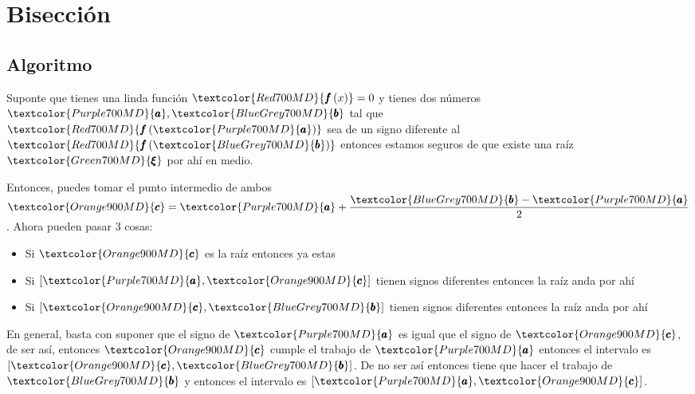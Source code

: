 \documentclass[12pt, fleqn]{report}                             %
\theoremstyle{break}                                            %
\newcommand{\Wrap}[1]           {\left( #1 \right)}             %
\newcommand{\Color}[2]{\textcolor{#1}{#2}}                      %
\newcommand \ColorFun          {Red700MD}                       %
\newcommand \ColorRoot         {Green700MD}                     %
\newcommand \ColorVarA         {Purple700MD}                    %
\newcommand \ColorVarB         {BlueGrey700MD}                  %
\newcommand \ColorVarC         {Orange900MD}                    %
\newcommand \Fun[1]      {\Color{\ColorFun}{\pmb{f}\Wrap{#1}}}          %
\newcommand \Root        {\Color{\ColorRoot}{\pmb{\xi} }}               %
\newcommand \VarA        {\Color{\ColorVarA}{\pmb{a} }}                 %
\newcommand \VarB        {\Color{\ColorVarB}{\pmb{b} }}                 %
\newcommand \VarC        {\Color{\ColorVarC}{\pmb{c} }}                 %
\begin{document}
    \chapter{Bisección}

        \section{Algoritmo}

            Suponte que tienes una linda función $\Fun{x} = 0$
            y tienes dos números $\VarA, \VarB$ tal que $\Fun{\VarA}$ sea de un signo diferente
            al $\Fun{\VarB}$ entonces estamos seguros de que existe una raíz $\Root$
            por ahí en medio.

            Entonces, puedes tomar el punto intermedio de ambos 
            $\VarC = \VarA + \dfrac{\VarB - \VarA}{2}$. Ahora pueden pasar 3 cosas:
            \begin{itemize}
                \item Si $\VarC$ es la raíz entonces ya estas
                \item Si $[\VarA, \VarC]$ tienen signos diferentes entonces la raíz anda por ahí
                \item Si $[\VarC, \VarB]$ tienen signos diferentes entonces la raíz anda por ahí
            \end{itemize}
            
            En general, basta con suponer que el signo de $\VarA$ es igual que el signo de $\VarC$,
            de ser así, entonces $\VarC$ cumple el trabajo de $\VarA$ entonces el intervalo es $[\VarC, \VarB]$.
            De no ser así entonces tiene que hacer el trabajo de $\VarB$ y entonces el intervalo es
            $[\VarA, \VarC]$.


\end{document}
